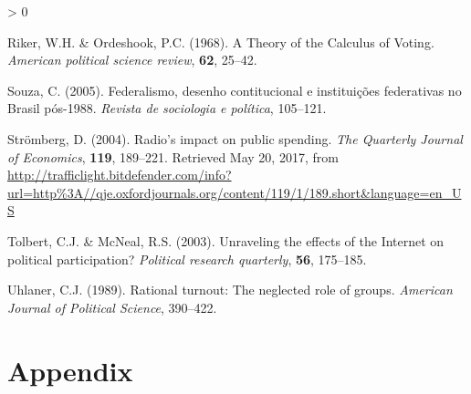 \documentclass[
  12pt,
]{article}
\newlength{\cslhangindent}
\newenvironment{CSLReferences}[2] %
 {%
  \setlength{\parindent}{0pt}
  \ifodd #1 \everypar{\setlength{\hangindent}{\cslhangindent}}\ignorespaces\fi
  \ifnum #2 > 0
  \setlength{\parskip}{#2\baselineskip}
  \fi
 }%
 {}
\begin{document}
\begin{CSLReferences}{1}{0}
\leavevmode\hypertarget{ref-riker_theory_1968}{}%
Riker, W.H. \& Ordeshook, P.C. (1968). A {Theory} of the {Calculus} of
{Voting}. \emph{American political science review}, \textbf{62}, 25--42.

\leavevmode\hypertarget{ref-souza_federalismo_2005}{}%
Souza, C. (2005). Federalismo, desenho contitucional e instituições
federativas no {Brasil} pós-1988. \emph{Revista de sociologia e
política}, 105--121.

\leavevmode\hypertarget{ref-stromberg_radios_2004}{}%
Strömberg, D. (2004). Radio's impact on public spending. \emph{The
Quarterly Journal of Economics}, \textbf{119}, 189--221. Retrieved May
20, 2017, from
\url{http://trafficlight.bitdefender.com/info?url=http\%3A//qje.oxfordjournals.org/content/119/1/189.short\&language=en_US}

\leavevmode\hypertarget{ref-tolbert_unraveling_2003}{}%
Tolbert, C.J. \& McNeal, R.S. (2003). Unraveling the effects of the
{Internet} on political participation? \emph{Political research
quarterly}, \textbf{56}, 175--185.

\leavevmode\hypertarget{ref-uhlaner_rational_1989}{}%
Uhlaner, C.J. (1989). Rational turnout: {The} neglected role of groups.
\emph{American Journal of Political Science}, 390--422.

\end{CSLReferences}

\clearpage

\hypertarget{appendix}{%
\section*{Appendix}\label{appendix}}

\begingroup\fontsize{10}{12}\selectfont
\end{document}
